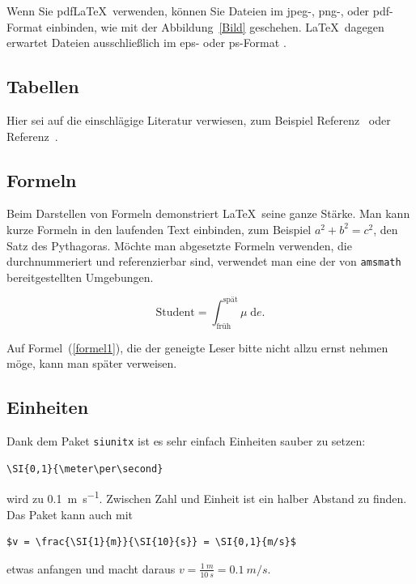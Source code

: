 \documentclass[
	fontsize=11pt,
	paper=a4,
	pagesize=auto,
	parskip=half,
	titlepage=on,
	ngerman
]{scrartcl}
\begin{document}
Wenn Sie pdf\LaTeX\ verwenden, können Sie Dateien im jpeg-, png-, oder pdf-Format einbinden, wie mit der Abbildung~\ref{Bild} geschehen. \LaTeX\ dagegen erwartet Dateien ausschließlich im eps- oder ps-Format \cite{andyroberts}.

\subsection{Tabellen}

Hier sei auf die einschlägige Literatur verwiesen, zum Beispiel Referenz~\cite{andyroberts} oder Referenz~\cite{hobbits}.

\subsection{Formeln}

Beim Darstellen von Formeln demonstriert \LaTeX\ seine ganze Stärke. Man kann kurze Formeln in den laufenden Text einbinden, zum Beispiel $a^2+b^2=c^2$, den Satz des Pythagoras. Möchte man abgesetzte Formeln verwenden, die durchnummeriert und referenzierbar sind, verwendet man eine der von \texttt{amsmath} \cite[Table 3.1]{amsmath} bereitgestellten Umgebungen.

\begin{equation}
	\textrm{Student} = \int_\textrm{früh}^\textrm{spät} \mu \; \mathrm{d}e. \label{formel1}
\end{equation}

Auf Formel~(\ref{formel1}), die der geneigte Leser bitte nicht allzu ernst nehmen möge, kann man später verweisen.

\subsection{Einheiten}

Dank dem Paket \texttt{siunitx} ist es sehr einfach Einheiten sauber zu setzen:

\begin{verbatim}
\SI{0,1}{\meter\per\second}
\end{verbatim}

wird zu \SI{0,1}{\meter\per\second}. Zwischen Zahl und Einheit ist ein halber Abstand zu finden. Das Paket kann auch mit

\begin{verbatim}
$v = \frac{\SI{1}{m}}{\SI{10}{s}} = \SI{0,1}{m/s}$
\end{verbatim}

etwas anfangen und macht daraus $v = \frac{\SI{1}{m}}{\SI{10}{s}} = \SI{0,1}{m/s}$.
\end{document}
